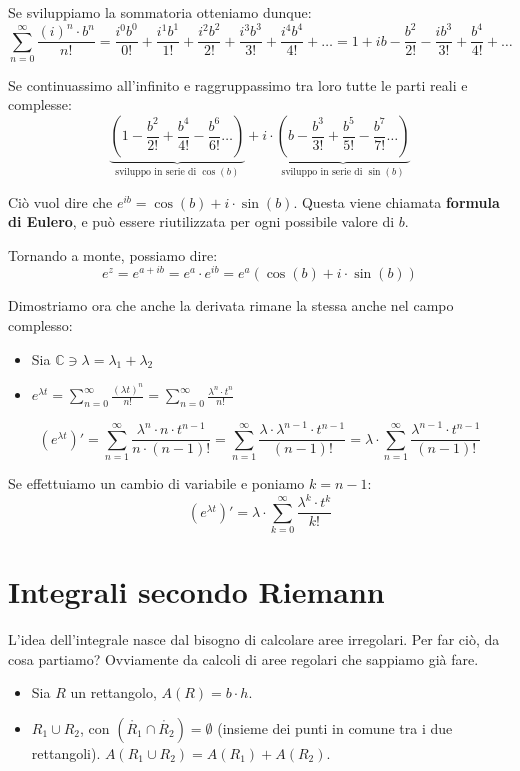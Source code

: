 \documentclass[12pt]{report}
\newcommand{\C}{\mathbb{C}}
\begin{document}
	Se sviluppiamo la sommatoria otteniamo dunque:
	\[
	\sum_{n=0}^{\infty} \frac{(i)^n \cdot b^n}{n!} = \frac{i^0 b^0}{0!} + \frac{i^1 b^1}{1!} + \frac{i^2 b^2}{2!} + \frac{i^3 b^3}{3!} + \frac{i^4 b^4}{4!} + \dots = 1 + ib - \frac{b^2}{2!} - \frac{ib^3}{3!} + \frac{b^4}{4!} + \dots
	\]
	
	Se continuassimo all'infinito e raggruppassimo tra loro tutte le parti reali e complesse:
	\[
	\underbrace{\left(1 - \frac{b^2}{2!} + \frac{b^4}{4!} - \frac{b^6}{6!} \dots\right)}_{\text{sviluppo in serie di } \cos(b)} + i \cdot \underbrace{\left(b - \frac{b^3}{3!} + \frac{b^5}{5!} - \frac{b^7}{7!} \dots\right)}_{\text{sviluppo in serie di } \sin(b)}
	\]
	
	Ciò vuol dire che $e^{ib} = \cos(b) + i \cdot \sin(b)$. Questa viene chiamata \textbf{formula di Eulero}, e può essere riutilizzata per ogni possibile valore di $b$.
	
	Tornando a monte, possiamo dire:
	\[
	e^z = e^{a+ib} = e^a \cdot e^{ib} = e^a (\cos(b) + i \cdot \sin(b))
	\]
	
	Dimostriamo ora che anche la derivata rimane la stessa anche nel campo complesso:
	\begin{itemize}
		\item Sia $\C \ni \lambda = \lambda_1 + \lambda_2$
		\item $e^{\lambda t} = \sum_{n=0}^{\infty} \frac{(\lambda t)^n}{n!} = \sum_{n=0}^{\infty} \frac{\lambda^n \cdot t^n}{n!}$
	\end{itemize}
	\[
	(e^{\lambda t})' = \sum_{n=1}^{\infty} \frac{\lambda^n \cdot n \cdot t^{n-1}}{n \cdot (n-1)!} = \sum_{n=1}^{\infty} \frac{\lambda \cdot \lambda^{n-1} \cdot t^{n-1}}{(n-1)!} = \lambda \cdot \sum_{n=1}^{\infty} \frac{\lambda^{n-1} \cdot t^{n-1}}{(n-1)!}
	\]
	
	Se effettuiamo un cambio di variabile e poniamo $k = n-1$:
	\[
	(e^{\lambda t})' = \lambda \cdot \sum_{k=0}^{\infty} \frac{\lambda^k \cdot t^k}{k!}
	\]
	
	\chapter{Integrali secondo Riemann}
	
	L'idea dell'integrale nasce dal bisogno di calcolare aree irregolari.
	Per far ciò, da cosa partiamo? Ovviamente da calcoli di aree regolari che sappiamo già fare.
	\begin{itemize}
		
		\item Sia $R$ un rettangolo, $A(R) = b \cdot h$.
		
		\item $R_1 \cup R_2$, con $(\mathring{R_1} \cap \mathring{R_2}) = \emptyset$ (insieme dei punti in comune tra i due rettangoli).
		$A(R_1 \cup R_2) = A(R_1) + A(R_2)$.
		
	\end{itemize}
	
\end{document}
